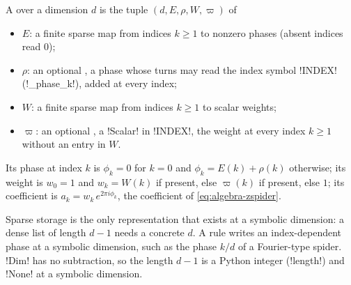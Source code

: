 \begin{definition}\label{def:algebra-phase-vector}
A  over a dimension $d$ is the tuple $(d,E,\rho,W,\varpi)$ of
\begin{itemize}
\item $E$: a finite sparse map from indices $k\ge 1$ to nonzero phases (absent indices read $0$);
\item $\rho$: an optional , a phase whose turns may read the index symbol \py!INDEX! (\code!_phase_k!), added at every index;
\item $W$: a finite sparse map from indices $k\ge 1$ to scalar weights;
\item $\varpi$: an optional , a \py!Scalar! in \py!INDEX!, the weight at every index $k\ge 1$ without an entry in $W$.
\end{itemize}
Its phase at index $k$ is $\phi_k=0$ for $k=0$ and $\phi_k=E(k)+\rho(k)$ otherwise; its weight is $w_0=1$ and $w_k=W(k)$ if present, else $\varpi(k)$ if present, else $1$; its coefficient is $a_k=w_k\,e^{2\pi i\phi_k}$, the coefficient of \cref{eq:algebra-zspider}.
\end{definition}

Sparse storage is the only representation that exists at a symbolic dimension: a dense list of length $d-1$ needs a concrete $d$. A rule writes an index-dependent phase at a symbolic dimension, such as the phase $k/d$ of a Fourier-type spider. \py!Dim! has no subtraction, so the length $d-1$ is a Python integer (\py!length!) and \py!None! at a symbolic dimension.

